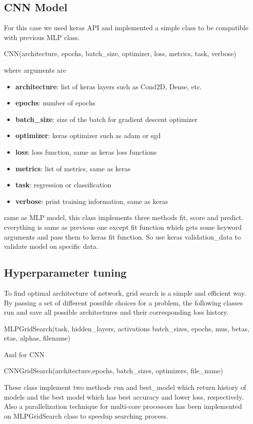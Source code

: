 \documentclass[10pt]{SelfArx} %
\begin{document}
\subsection{CNN Model}
For this case we used keras API and implemented a simple class to be compatible with previous MLP class.
\begin{python}
CNN(architecture, epochs,
   batch_size, optimizer, loss,
   metrics, task, verbose)
\end{python}
where arguments are
\begin{itemize}
\item 	\textbf{architecture}: list of keras layers such as Cond2D, Dense, etc.
\item  \textbf{epochs}: number of epochs
\item  \textbf{batch\_size}: size of the batch for gradient descent optimizer
\item  \textbf{optimizer}: keras optimizer such as adam or sgd
\item  \textbf{loss}: loss function, same as keras loss functions
\item \textbf{metrics}: list of metrics, same as keras
\item  \textbf{task}: regression or classification
\item  \textbf{verbose}: print training information, same as keras
\end{itemize}

same as MLP model, this class implements three methods fit, score and predict. everything is same as previous one except fit function which gets some keyword arguments and pass them to keras fit function. So use keras validation\_data to validate model on specific data.

\subsection{Hyperparameter tuning}
To find optimal architecture of network, grid search is a simple and efficient way. By passing a set of different possible choices for a problem, the following classes run and save all possible architectures and their corresponding loss history.
\begin{python}
MLPGridSearch(task, hidden_layers, 
      activations batch_sizes,
      epochs, mus, betas, etas,
      alphas, filename)
\end{python}
And for CNN

\begin{python}
CNNGridSearch(architecture,epochs,
	  batch_sizes, optimizers,
	  file_name)
\end{python}
These class implement two methods run and best\_model which return history of models and the best model which has best accuracy and lower loss, respectively. Also a parallelization technique for multi-core processors has been implemented on MLPGridSearch class to speedup searching process. 
\end{document}
